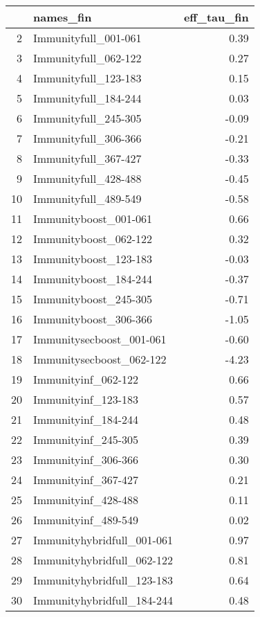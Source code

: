\begin{table}[ht]
\centering
\begin{tabular}{rlr}
  \hline
 & names\_fin & eff\_tau\_fin \\ 
  \hline
2 & Immunityfull\_001-061 & 0.39 \\ 
  3 & Immunityfull\_062-122 & 0.27 \\ 
  4 & Immunityfull\_123-183 & 0.15 \\ 
  5 & Immunityfull\_184-244 & 0.03 \\ 
  6 & Immunityfull\_245-305 & -0.09 \\ 
  7 & Immunityfull\_306-366 & -0.21 \\ 
  8 & Immunityfull\_367-427 & -0.33 \\ 
  9 & Immunityfull\_428-488 & -0.45 \\ 
  10 & Immunityfull\_489-549 & -0.58 \\ 
  11 & Immunityboost\_001-061 & 0.66 \\ 
  12 & Immunityboost\_062-122 & 0.32 \\ 
  13 & Immunityboost\_123-183 & -0.03 \\ 
  14 & Immunityboost\_184-244 & -0.37 \\ 
  15 & Immunityboost\_245-305 & -0.71 \\ 
  16 & Immunityboost\_306-366 & -1.05 \\ 
  17 & Immunitysecboost\_001-061 & -0.60 \\ 
  18 & Immunitysecboost\_062-122 & -4.23 \\ 
  19 & Immunityinf\_062-122 & 0.66 \\ 
  20 & Immunityinf\_123-183 & 0.57 \\ 
  21 & Immunityinf\_184-244 & 0.48 \\ 
  22 & Immunityinf\_245-305 & 0.39 \\ 
  23 & Immunityinf\_306-366 & 0.30 \\ 
  24 & Immunityinf\_367-427 & 0.21 \\ 
  25 & Immunityinf\_428-488 & 0.11 \\ 
  26 & Immunityinf\_489-549 & 0.02 \\ 
  27 & Immunityhybridfull\_001-061 & 0.97 \\ 
  28 & Immunityhybridfull\_062-122 & 0.81 \\ 
  29 & Immunityhybridfull\_123-183 & 0.64 \\ 
  30 & Immunityhybridfull\_184-244 & 0.48 \\ 

\end{tabular}
\end{table}

